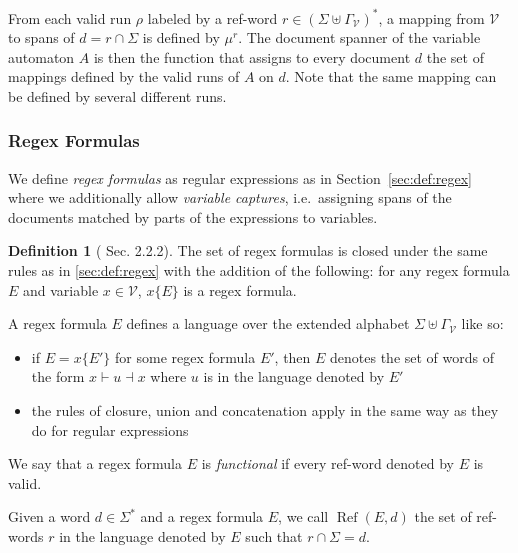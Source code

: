 \documentclass[12px]{article}
\theoremstyle{definition}
\newtheorem{definition}{Definition}
\DeclareMathOperator{\Ref}{Ref}
\begin{document}
        From each valid run $\rho$ labeled by a ref-word $r \in {(\Sigma \uplus
        \Gamma_\mathcal{V})}^*$, a mapping from $\mathcal{V}$ to spans of $d =
        r \cap \Sigma$ is defined by $\mu^r$. The document spanner of the
        variable automaton $A$ is then the function that assigns to every
        document $d$ the set of mappings defined by the valid runs of $A$ on
        $d$. Note that the same mapping can be defined by several different
        runs.


      \subsubsection{Regex Formulas}

        We define \emph{regex formulas} as regular expressions as in
        Section~\ref{sec:def:regex} where we additionally allow \emph{variable
        captures}, i.e.\ assigning spans of the documents matched by parts of
        the expressions to variables.

        \begin{definition}[\cite{peterfreund} Sec. 2.2.2]
          The set of regex formulas is closed under the same rules as in
          \ref{sec:def:regex} with the addition of the following: for any regex
          formula $E$ and variable $x \in \mathcal{V}$, $x\{E\}$ is a regex
          formula.

          A regex formula $E$ defines a language over the extended alphabet
          $\Sigma \uplus \Gamma_\mathcal{V}$ like so:
            \begin{itemize}
              \item if $E = x\{E'\}$ for some regex formula $E'$, then $E$ denotes
                the set of words of the form $x{\vdash} u {\dashv}x$ where $u$ is
                in the language denoted by $E'$
              \item the rules of closure, union and concatenation apply in the same
                way as they do for regular expressions
            \end{itemize}

          We say that a regex formula $E$ is \textit{functional} if every
          ref-word denoted by $E$ is valid.

          Given a word $d \in \Sigma^*$ and a regex formula $E$, we call
          $\Ref(E, d)$ the set of ref-words $r$ in the language denoted by $E$
          such that $r \cap \Sigma = d$.
        \end{definition}
\end{document}
